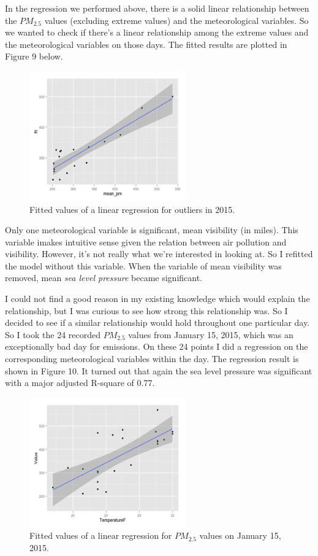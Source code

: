 \documentclass[11pt]{article} %
\begin{document}
In the regression we performed above, there is a solid linear relationship between the \(PM_{2.5}\) values (excluding extreme values) and the meteorological variables. So we wanted to check if there's a linear relationship among the extreme values and the meteorological variables on those days. 
The fitted results are plotted in Figure 9 below.

 \begin{figure}[!ht]
  \centering
    \includegraphics[width=0.6\textwidth]{Figure2-6}
       \caption{Fitted values of a linear regression for outliers in 2015.}
\end{figure}

Only one meteorological variable is significant, mean visibility (in miles). This variable imakes intuitive sense given the relation between air pollution and visibility. However, it's not really what we're interested in looking at. So I refitted the model without this variable. When the variable of mean visibility was removed, mean \emph{sea level pressure} became significant.

I could not find a good reason in my existing knowledge which would explain the relationship, but I was curious to see how strong this relationship was. So I decided to see if a similar relationship would hold throughout one particular day. 
So I took the 24 recorded \(PM_{2.5}\) values from January 15, 2015, which was an exceptionally bad day for emissions. On these 24 points I did a regression on the corresponding meteorological variables within the day. The regression result is shown in Figure 10. It turned out that again the sea level pressure was significant with a major adjusted R-square of 0.77.

 \begin{figure}[!ht]
  \centering
    \includegraphics[width=0.6\textwidth]{Figure2-7}
      \caption{Fitted values of a linear regression for \(PM_{2.5}\) values on January 15, 2015.}
\end{figure}
\end{document}
